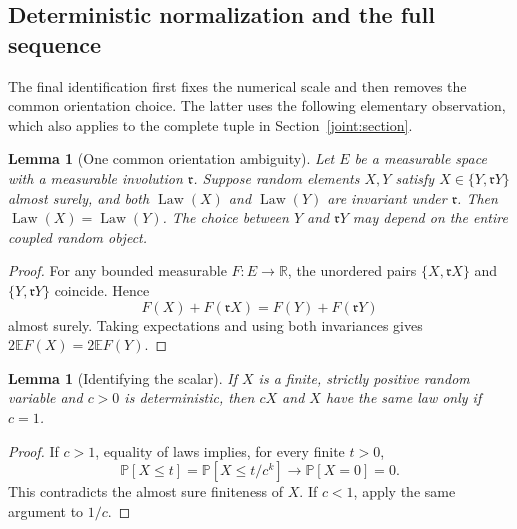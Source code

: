 \documentclass[11pt]{article}
\numberwithin{equation}{section}
\newtheorem{lemma}[theorem]{Lemma}
\theoremstyle{definition}
\theoremstyle{remark}
\newcommand{\1}{\mathbf 1}
\begin{document}
\subsection{Deterministic normalization and the full sequence}

The final identification first fixes the numerical scale and then
removes the common orientation choice.  The latter uses the following
elementary observation, which also applies to the complete tuple in
Section~\ref{joint:section}.

\begin{lemma}[One common orientation ambiguity]\label{joint:reflection}
Let $E$ be a measurable space with a measurable involution
$\mathfrak r$.  Suppose random elements $X,Y$ satisfy
$X\in\{Y,\mathfrak rY\}$ almost surely, and both $\operatorname{Law}(X)$ and
$\operatorname{Law}(Y)$ are invariant under $\mathfrak r$.  Then
$\operatorname{Law}(X)=\operatorname{Law}(Y)$.  The choice between $Y$ and $\mathfrak rY$ may
depend on the entire coupled random object.
\end{lemma}

\begin{proof}
For any bounded measurable $F:E\to\mathbb R$, the unordered pairs
$\{X,\mathfrak rX\}$ and $\{Y,\mathfrak rY\}$ coincide.  Hence
\[
 F(X)+F(\mathfrak rX)=F(Y)+F(\mathfrak rY)
\]
almost surely.  Taking expectations and using both invariances gives
$2\mathbb E F(X)=2\mathbb E F(Y)$.
\end{proof}

\begin{lemma}[Identifying the scalar]
\label{comp:scalar}
If $X$ is a finite, strictly positive random variable and $c>0$
is deterministic, then $cX$ and $X$ have the same law only if
$c=1$.
\end{lemma}

\begin{proof}
If $c>1$, equality of laws implies, for every finite $t>0$,
\[
 \mathbb P[X\le t]=\mathbb P[X\le t/c^k]\longrightarrow\mathbb P[X=0]=0.
\]
This contradicts the almost sure finiteness of $X$.  If $c<1$,
apply the same argument to $1/c$.
\end{proof}
\end{document}
